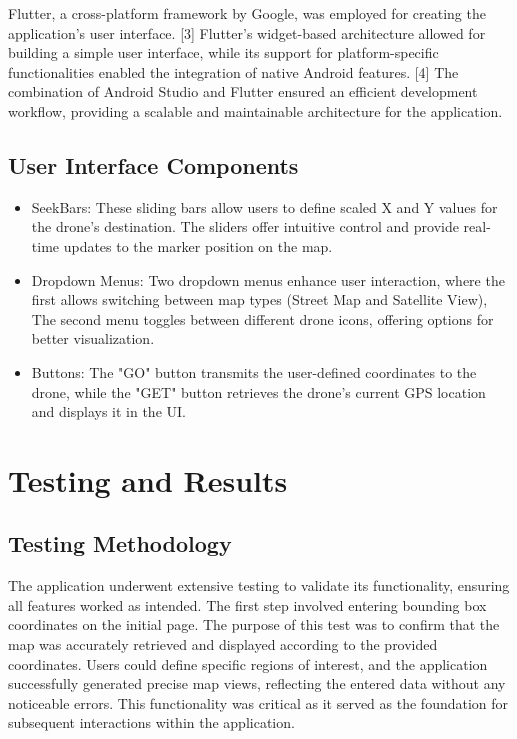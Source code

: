\documentclass[conference]{IEEEtran}
\begin{document}
Flutter, a cross-platform framework by Google, was employed for creating the application's user interface. [3] Flutter's widget-based architecture allowed for building a simple user interface, while its support for platform-specific functionalities enabled the integration of native Android features. [4] The combination of Android Studio and Flutter ensured an efficient development workflow, providing a scalable and maintainable architecture for the application.


\subsection{User Interface Components}

\begin{itemize}
    \item SeekBars: These sliding bars allow users to define scaled X and Y values for the drone’s destination. The sliders offer intuitive control and provide real-time updates to the marker position on the map.
    \item Dropdown Menus: Two dropdown menus enhance user interaction, where the first allows switching between map types (Street Map and Satellite View), The second menu toggles between different drone icons, offering options for better visualization.
    \item Buttons: The "GO" button transmits the user-defined coordinates to the drone, while the "GET" button retrieves the drone’s current GPS location and displays it in the UI.
\end{itemize}



\section{Testing and Results}

\subsection{Testing Methodology}

The application underwent extensive testing to validate its functionality, ensuring all features worked as intended. The first step involved entering bounding box coordinates on the initial page. The purpose of this test was to confirm that the map was accurately retrieved and displayed according to the provided coordinates. Users could define specific regions of interest, and the application successfully generated precise map views, reflecting the entered data without any noticeable errors. This functionality was critical as it served as the foundation for subsequent interactions within the application.
\end{document}
